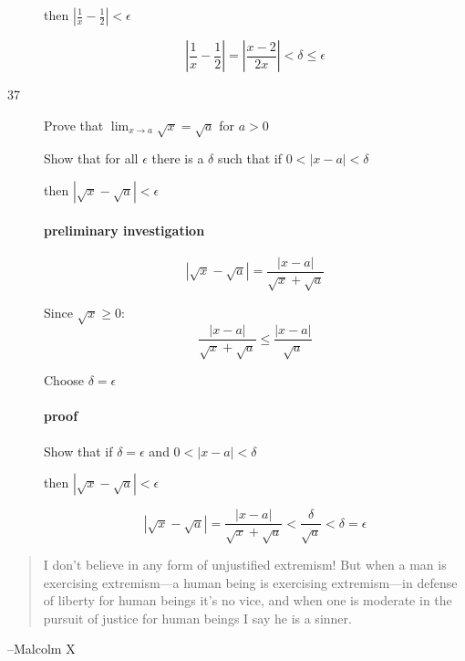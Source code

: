 \documentclass[letterpaper, landscape]{exam}
\begin{document}
\begin{description}
        then $\left| \frac{1}{x} - \frac{1}{2} \right| < \epsilon$

        \[
          \left| \frac{1}{x} - \frac{1}{2} \right| = \left| \frac{x - 2}{2x} \right| < \delta \leq \epsilon
        \]


      \newpage

      \item[37] Prove that $\lim_{x \to a} \sqrt{x} = \sqrt{a}$ for $a > 0$

        Show that for all $\epsilon$ there is a $\delta$ such that if 
        $0 < |x - a| < \delta$ 
        
        then $\left| \sqrt{x} - \sqrt{a} \right| < \epsilon$

        \paragraph{preliminary investigation}

        \[
          \left| \sqrt{x} - \sqrt{a} \right| = \frac{|x - a|}{\sqrt{x} + \sqrt{a}} 
        \]


        Since $\sqrt{x} \geq 0$:
        \[
          \frac{|x - a|}{\sqrt{x} + \sqrt{a}} \leq \frac{|x - a|}{\sqrt{a}}
        \]

        Choose $\delta = \epsilon$

        \paragraph{proof}
        Show that if $\delta = \epsilon$ and $0 < |x - a| < \delta$ 
        
        then $\left| \sqrt{x} - \sqrt{a} \right| < \epsilon$

        \[
          \left| \sqrt{x} - \sqrt{a} \right| = \frac{|x - a|}{\sqrt{x} + \sqrt{a}} < \frac{\delta}{\sqrt{a}} < \delta = \epsilon
        \]

    \end{description}

  \else
    \vspace{10 cm}
    \begin{quote}
      \begin{em}
        I don't believe in any form of unjustified extremism! But when a man is
        exercising extremism---a human being is exercising extremism---in
        defense of liberty for human beings it's no vice, and when one is
        moderate in the pursuit of justice for human beings I say he is a
        sinner. 
      \end{em}
    \end{quote}
    \hspace{1 cm} --Malcolm X
  \fi
\end{document}
